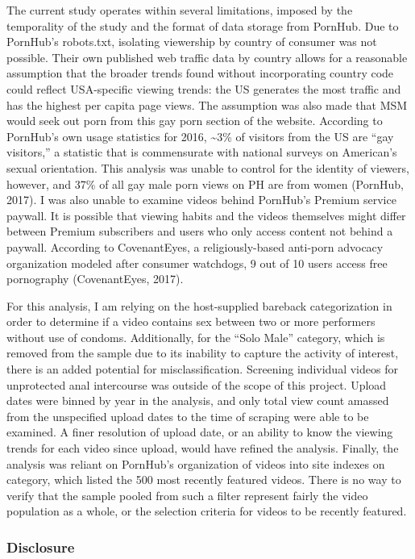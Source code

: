 \documentclass[]{article}
\begin{document}
The current study operates within several limitations, imposed by the
temporality of the study and the format of data storage from PornHub.
Due to PornHub's robots.txt, isolating viewership by country of consumer
was not possible. Their own published web traffic data by country allows
for a reasonable assumption that the broader trends found without
incorporating country code could reflect USA-specific viewing trends:
the US generates the most traffic and has the highest per capita page
views. The assumption was also made that MSM would seek out porn from
this gay porn section of the website. According to PornHub's own usage
statistics for 2016, \textasciitilde{}3\% of visitors from the US are
``gay visitors,'' a statistic that is commensurate with national surveys
on American's sexual orientation. This analysis was unable to control
for the identity of viewers, however, and 37\% of all gay male porn
views on PH are from women (PornHub, 2017). I was also unable to examine
videos behind PornHub's Premium service paywall. It is possible that
viewing habits and the videos themselves might differ between Premium
subscribers and users who only access content not behind a paywall.
According to CovenantEyes, a religiously-based anti-porn advocacy
organization modeled after consumer watchdogs, 9 out of 10 users access
free pornography (CovenantEyes, 2017).

For this analysis, I am relying on the host-supplied bareback
categorization in order to determine if a video contains sex between two
or more performers without use of condoms. Additionally, for the ``Solo
Male'' category, which is removed from the sample due to its inability
to capture the activity of interest, there is an added potential for
misclassification. Screening individual videos for unprotected anal
intercourse was outside of the scope of this project. Upload dates were
binned by year in the analysis, and only total view count amassed from
the unspecified upload dates to the time of scraping were able to be
examined. A finer resolution of upload date, or an ability to know the
viewing trends for each video since upload, would have refined the
analysis. Finally, the analysis was reliant on PornHub's organization of
videos into site indexes on category, which listed the 500 most recently
featured videos. There is no way to verify that the sample pooled from
such a filter represent fairly the video population as a whole, or the
selection criteria for videos to be recently featured.

\subsubsection{Disclosure}\label{disclosure}
\end{document}
